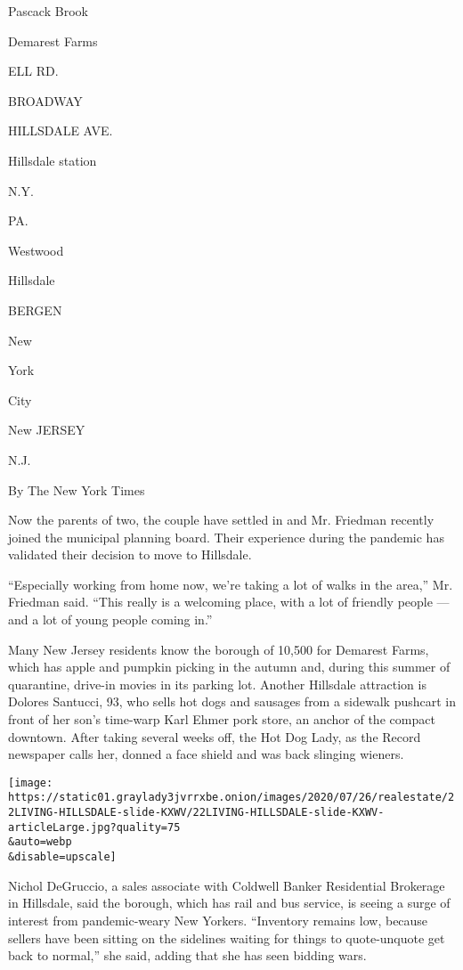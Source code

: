 Pascack Brook

Demarest Farms

ELL RD.

BROADWAY

HILLSDALE AVE.

Hillsdale station

N.Y.

PA.

Westwood

Hillsdale

BERGEN

New

York

City

New JERSEY

N.J.

By The New York Times

Now the parents of two, the couple have settled in and Mr. Friedman
recently joined the municipal planning board. Their experience during
the pandemic has validated their decision to move to Hillsdale.

``Especially working from home now, we're taking a lot of walks in the
area,'' Mr. Friedman said. ``This really is a welcoming place, with a
lot of friendly people --- and a lot of young people coming in.''

Many New Jersey residents know the borough of 10,500 for Demarest Farms,
which has apple and pumpkin picking in the autumn and, during this
summer of quarantine, drive-in movies in its parking lot. Another
Hillsdale attraction is Dolores Santucci, 93, who sells hot dogs and
sausages from a sidewalk pushcart in front of her son's time-warp Karl
Ehmer pork store, an anchor of the compact downtown. After taking
several weeks off, the Hot Dog Lady, as the Record newspaper calls her,
donned a face shield and was back slinging wieners.

\texttt{[image: https://static01.graylady3jvrrxbe.onion/images/2020/07/26/realestate/22LIVING-HILLSDALE-slide-KXWV/22LIVING-HILLSDALE-slide-KXWV-articleLarge.jpg?quality=75\\\&auto=webp\\\&disable=upscale]}

Nichol DeGruccio, a sales associate with Coldwell Banker Residential
Brokerage in Hillsdale, said the borough, which has rail and bus
service, is seeing a surge of interest from pandemic-weary New Yorkers.
``Inventory remains low, because sellers have been sitting on the
sidelines waiting for things to quote-unquote get back to normal,'' she
said, adding that she has seen bidding wars.


